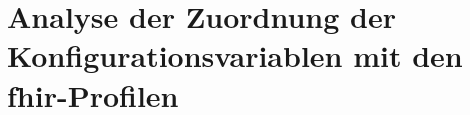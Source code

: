 \section{Analyse der Zuordnung der Konfigurationsvariablen mit den \acs{fhir}-Profilen} \label{sec:validresultpatmatc}

 



